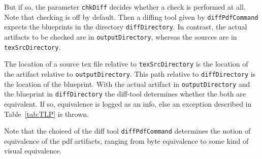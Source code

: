 But if so, the parameter \texttt{chkDiff} 
decides whether a check is performed at all. 
Note that checking is off by default. 
Then a diffing tool given by \texttt{diffPdfCommand} 
expects the blueprints in the directory \texttt{diffDirectory}. 
In contrast, the actual artifacts to be checked are in \texttt{outputDirectory}, 
whereas the sources are in \texttt{texSrcDirectory}. 

The location of a source tex file relative to \texttt{texSrcDirectory} 
is the location of the artifact relative to \texttt{outputDirectory}. 
This path relative to \texttt{diffDirectory} is the location of the blueprint. 
With the actual artifact in \texttt{outputDirectory} 
and the blueprint in \texttt{diffDirectory} 
the diff-tool determines whether the both are equivalent. 
If so, equivalence is logged as an info, 
else an exception described in Table~\ref{tab:TLP} is thrown. 

Note that the choiced of the diff tool \texttt{diffPdfCommand} 
determines the notion of equivalence of the pdf artifacts, 
ranging from byte equivalence to some kind of visual equivalence. 


